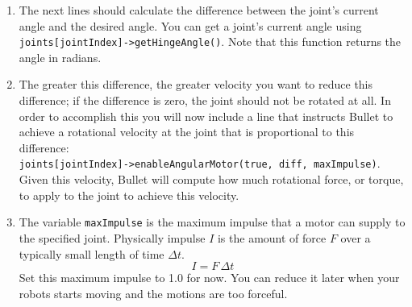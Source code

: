 \documentclass[12pt]{article}
\begin{document}
\begin{enumerate}
\item The next lines should calculate the difference between the joint's current angle and the desired angle. You can get a joint's current angle using \texttt{joints[jointIndex]->getHingeAngle()}. Note that this function returns the angle in radians.

\item The greater this difference, the greater velocity you want to reduce this difference; if the difference is zero, the joint should not be rotated at all. In order to accomplish this you will now include a line that instructs Bullet to achieve a rotational velocity at the joint that is proportional to this difference: \\
    \texttt{joints[jointIndex]->enableAngularMotor(true, diff, maxImpulse)}. \\
    Given this velocity, Bullet will compute how much rotational force, or torque, to apply to the joint to achieve this velocity.

\item The variable \verb|maxImpulse| is the maximum impulse that a motor can supply to the specified joint. Physically impulse $I$ is the amount of force $F$ over a typically small length of time $\Delta t$. $$I = F\,\Delta t$$  Set this maximum impulse to 1.0 for now. You can reduce it later when your robots starts moving and the motions are too forceful.
 


\end{enumerate}
\end{document}
